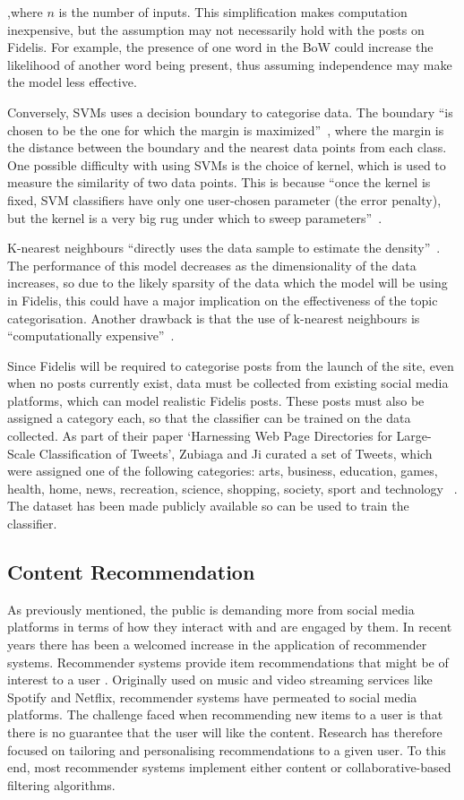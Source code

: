 \noindent ,where $n$ is the number of inputs. This simplification makes computation inexpensive, but the assumption may not necessarily hold with the posts on Fidelis. For example, the presence of one word in the BoW could increase the likelihood of another word being present, thus assuming independence may make the model less effective.

Conversely, SVMs uses a decision boundary to categorise data. The boundary ``is chosen to be the one for which the margin is maximized''~\cite{Bishop:SVM}, where the margin is the distance between the boundary and the nearest data points from each class. One possible difficulty with using SVMs is the choice of kernel, which is used to measure the similarity of two data points. This is because ``once the kernel is fixed, SVM classifiers have only one user-chosen parameter (the error penalty), but the kernel is a very big rug under which to sweep parameters''~\cite{Burges:SVM}.

K-nearest neighbours ``directly uses the data sample to estimate the density''~\cite{Zaki:KNN}. The performance of this model decreases as the dimensionality of the data increases, so due to the likely sparsity of the data which the model will be using in Fidelis, this could have a major implication on the effectiveness of the topic categorisation. Another drawback is that the use of k-nearest neighbours is ``computationally expensive''~\cite{Kuncheva:KNN}.

Since Fidelis will be required to categorise posts from the launch of the site, even when no posts currently exist, data must be collected from existing social media platforms, which can model realistic Fidelis posts. These posts must also be assigned a category each, so that the classifier can be trained on the data collected. As part of their paper `Harnessing Web Page Directories for Large-Scale Classification of Tweets', Zubiaga and Ji curated a set of Tweets, which were assigned one of the following categories: arts, business, education, games, health, home, news, recreation, science, shopping, society, sport and technology ~\cite{Zubiaga:Tweets}. The dataset has been made publicly available so can be used to train the classifier.

\subsection{Content Recommendation}
As previously mentioned, the public is demanding more from social media platforms in terms of how they interact with and are engaged by them. In recent years there has been a welcomed increase in the application of recommender systems. Recommender systems provide item recommendations that might be of interest to a user \cite{ricci2011introduction}. Originally used on music and video streaming services like Spotify and Netflix, recommender systems have permeated to social media platforms. The challenge faced when recommending new items to a user is that there is no guarantee that the user will like the content. Research has therefore focused on tailoring and personalising recommendations to a given user. To this end, most recommender systems implement either content or collaborative-based filtering algorithms.

